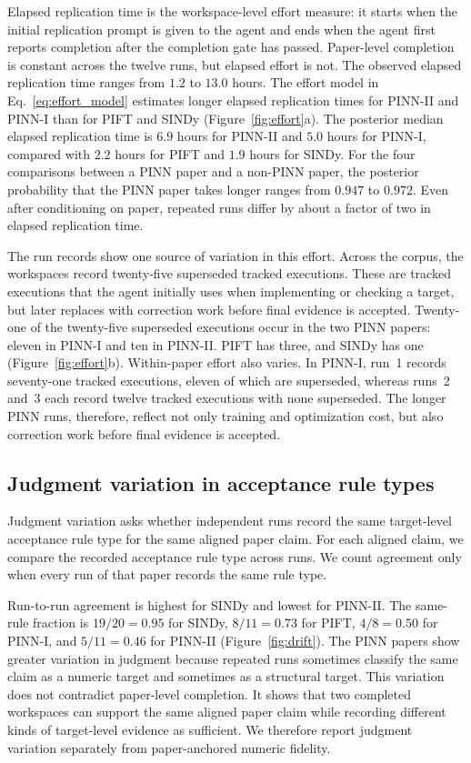 \documentclass[authoryear,5p,times,nopreprintline]{elsarticle}
\begin{document}
Elapsed replication time is the workspace-level effort measure: it starts when the initial replication prompt is given to the agent and ends when the agent first reports completion after the completion gate has passed.
Paper-level completion is constant across the twelve runs, but elapsed effort is not.
The observed elapsed replication time ranges from \(1.2\) to \(13.0\) hours.
The effort model in Eq.~\eqref{eq:effort_model} estimates longer elapsed replication times for PINN-II and PINN-I than for PIFT and SINDy (Figure~\ref{fig:effort}a).
The posterior median elapsed replication time is \(6.9\) hours for PINN-II and \(5.0\) hours for PINN-I, compared with \(2.2\) hours for PIFT and \(1.9\) hours for SINDy.
For the four comparisons between a PINN paper and a non-PINN paper, the posterior probability that the PINN paper takes longer ranges from \(0.947\) to \(0.972\).
Even after conditioning on paper, repeated runs differ by about a factor of two in elapsed replication time.

The run records show one source of variation in this effort.
Across the corpus, the workspaces record twenty-five superseded tracked executions.
These are tracked executions that the agent initially uses when implementing or checking a target, but later replaces with correction work before final evidence is accepted.
Twenty-one of the twenty-five superseded executions occur in the two PINN papers: eleven in PINN-I and ten in PINN-II.
PIFT has three, and SINDy has one (Figure~\ref{fig:effort}b).
Within-paper effort also varies.
In PINN-I, run~1 records seventy-one tracked executions, eleven of which are superseded, whereas runs~2 and~3 each record twelve tracked executions with none superseded.
The longer PINN runs, therefore, reflect not only training and optimization cost, but also correction work before final evidence is accepted.

\subsection{Judgment variation in acceptance rule types}\label{sec:results_drift}
Judgment variation asks whether independent runs record the same target-level acceptance rule type for the same aligned paper claim.
For each aligned claim, we compare the recorded acceptance rule type across runs.
We count agreement only when every run of that paper records the same rule type.

Run-to-run agreement is highest for SINDy and lowest for PINN-II.
The same-rule fraction is \(19/20=0.95\) for SINDy, \(8/11=0.73\) for PIFT, \(4/8=0.50\) for PINN-I, and \(5/11=0.46\) for PINN-II (Figure~\ref{fig:drift}).
The PINN papers show greater variation in judgment because repeated runs sometimes classify the same claim as a numeric target and sometimes as a structural target.
This variation does not contradict paper-level completion.
It shows that two completed workspaces can support the same aligned paper claim while recording different kinds of target-level evidence as sufficient.
We therefore report judgment variation separately from paper-anchored numeric fidelity.
\end{document}
